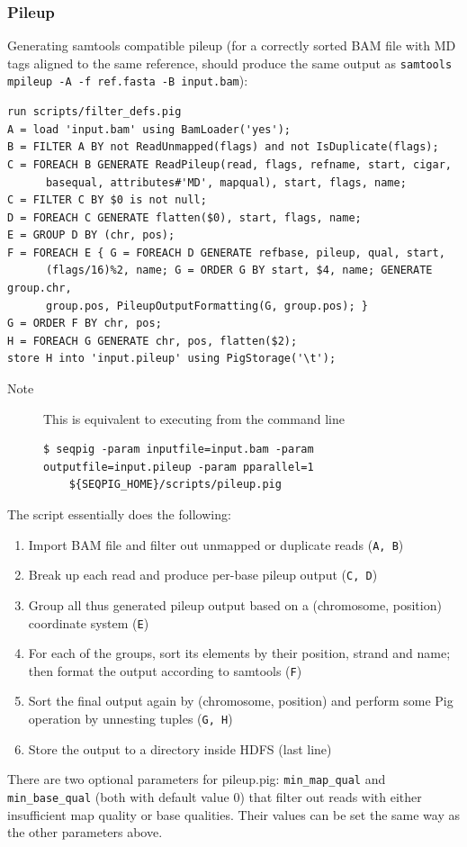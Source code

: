 \subsubsection{Pileup}
\label{subsubsect:pileup}
Generating samtools compatible pileup (for a correctly sorted BAM file
with MD tags aligned to the same reference, should produce the same output as
{\tt samtools mpileup -A -f ref.fasta -B input.bam}):
\begin{lstlisting}
run scripts/filter_defs.pig
A = load 'input.bam' using BamLoader('yes');
B = FILTER A BY not ReadUnmapped(flags) and not IsDuplicate(flags);
C = FOREACH B GENERATE ReadPileup(read, flags, refname, start, cigar,
      basequal, attributes#'MD', mapqual), start, flags, name;
C = FILTER C BY $0 is not null;
D = FOREACH C GENERATE flatten($0), start, flags, name;
E = GROUP D BY (chr, pos);
F = FOREACH E { G = FOREACH D GENERATE refbase, pileup, qual, start,
      (flags/16)%2, name; G = ORDER G BY start, $4, name; GENERATE group.chr,
      group.pos, PileupOutputFormatting(G, group.pos); }
G = ORDER F BY chr, pos;
H = FOREACH G GENERATE chr, pos, flatten($2);
store H into 'input.pileup' using PigStorage('\t');
\end{lstlisting}
\begin{description}
	\item[Note] This is equivalent to executing from the command line
\begin{lstlisting}
$ seqpig -param inputfile=input.bam -param outputfile=input.pileup -param pparallel=1
    ${SEQPIG_HOME}/scripts/pileup.pig
\end{lstlisting}
\end{description}
The script essentially does the following:
\begin{enumerate}
\item Import BAM file and filter out unmapped or duplicate reads ({\tt A, B})
\item Break up each read and produce per-base pileup output ({\tt C, D})
\item Group all thus generated pileup output based on a (chromosome, position)
coordinate system ({\tt E})
\item For each of the groups, sort its elements by their position, strand and name;
then format the output according to samtools ({\tt F})
\item Sort the final output again by (chromosome, position) and perform
some Pig operation by unnesting tuples ({\tt G, H})
\item Store the output to a directory inside HDFS (last line)
\end{enumerate}
There are two optional parameters for pileup.pig: {\tt min\_map\_qual} and
{\tt min\_base\_qual} (both with default value 0) that filter out reads with
either insufficient map quality or base qualities. Their values can
be set the same way as the other parameters above.

